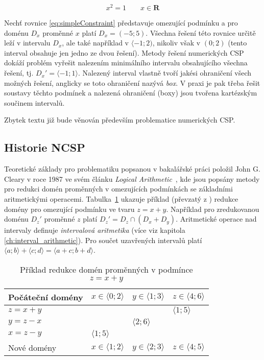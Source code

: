 \begin{equation} \label{eq:simpleConstraint}
x^2 = 1\qquad x \in \boldsymbol{R}
\end{equation}

Nechť rovnice \ref{eq:simpleConstraint} představuje omezující podmínku a pro doménu $D_x$ proměnné $x$ platí $D_x = (-5;5)$. Všechna řešení této rovnice určitě leží v intervalu $D_x$, ale také například v $\langle -1;2)$, nikoliv však v $(0;2)$ (tento interval obsahuje jen jedno ze dvou řešení). Metody řešení numerických CSP dokáží problém vyřešit nalezením minimálního intervalu obsahujícího všechna řešení, tj. $D_x' = \langle -1;1\rangle$. Nalezený interval vlastně tvoří jakési ohraničení všech možných řešení, anglicky se toto ohraničení nazývá \emph{box}. V praxi je pak třeba řešit soustavy těchto podmínek a nalezená ohraničení (boxy) jsou tvořena kartézským součinem intervalů.

Zbytek textu již bude věnován především problematice numerických CSP.

\subsection{Historie NCSP}

Teoretické základy pro problematiku popsanou v bakalářské práci položil John G. Cleary v roce 1987 ve svém článku \emph{Logical Arithmetic}~\cite{cleary87}, kde jsou popsány metody pro redukci domén proměnných v omezujících podmínkách se základními aritmetickými operacemi. Tabulka~\ref{narrowingTable} ukazuje příklad (převzatý z \cite{cleary87}) redukce domény pro omezující podmínku ve tvaru $z = x + y$. Například pro zredukovanou doménu $D_z'$ proměnné $z$ platí $D_z' = D_z \cap (D_x + D_y)$. Aritmetické operace nad intervaly definuje \emph{intervalová aritmetika} (více viz kapitola \ref{ch:interval_arithmetic}). Pro součet uzavřených intervalů platí $\langle a;b \rangle + \langle c;d \rangle = \langle a + c ; b + d \rangle$.

\begin{table}[ht]
\centering
\label{narrowingTable}
\begin{tabular}{|l|l|l|l|}
\hline
 Počáteční domény & $x \in \langle 0;2 \rangle$ & $y \in \langle 1;3 \rangle$ & $z \in \langle 4;6 \rangle$  \\ \hline
 $z = x+y$  &  & &  $\langle 1;5 \rangle$  \\ \hline
 $y = z-x$  & & $\langle 2;6 \rangle$  &  \\ \hline
 $x = z-y$  & $\langle 1;5 \rangle$  &  &  \\ \hline
 Nové domény & $x \in \langle 1;2 \rangle$ & $y \in \langle 2;3 \rangle$ & $z \in \langle 4;5 \rangle$ \\ \hline
\end{tabular}
\caption{Příklad redukce domén proměnných v podmínce $z = x + y$}
\end{table}

